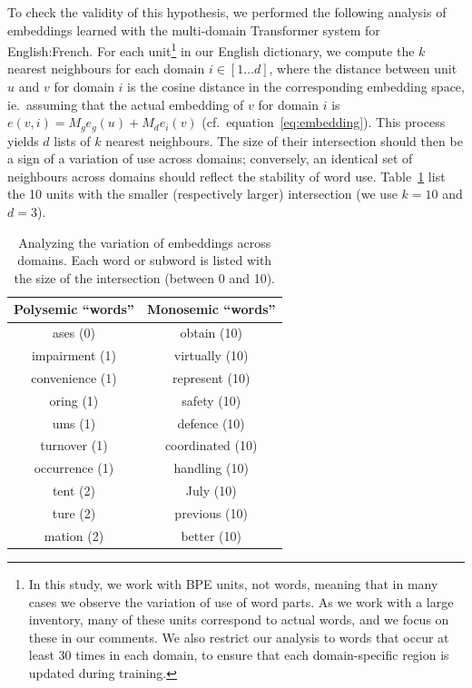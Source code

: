 \documentclass[11pt,a4paper]{article}
\begin{document}
To check the validity of this hypothesis, we performed the following analysis of embeddings learned with the multi-domain Transformer system for English:French. For each unit\footnote{In this study, we work with BPE units, not words, meaning that in many cases we observe the variation of use of word parts. As we work with a large inventory, many of these units correspond to actual words, and we focus on these in our comments. We also restrict our analysis to words that occur at least 30 times in each domain, to ensure that each domain-specific region is updated during training.} in our English dictionary, we compute the $k$ nearest neighbours for each domain $i \in [1\dots{}d]$, where the distance between unit $u$ and $v$ for domain $i$ is the cosine distance in the corresponding embedding space, ie.\ assuming that the actual embedding of $v$ for domain $i$ is $e(v,i) = M_ge_g(u) + M_de_i(v)$ (cf.\ equation~\eqref{eq:embedding}). This process yields $d$ lists of $k$ nearest neighbours. The size of their intersection should then be a sign of a variation of use across domains; conversely, an identical set of neighbours across domains should reflect the stability of word use. Table~\ref{tab:embeddings} list the 10 units with the smaller (respectively larger) intersection (we use $k=10$ and $d=3$). 

\begin{table}
  \centering
  \begin{tabularx}{1.0\linewidth}{c|c}
    Polysemic ``words'' & Monosemic ``words'' \\ \hline
     ases (0) &               obtain (10) \\       
     impairment (1) &     virtually (10) \\    
     convenience (1) &    represent (10) \\    
     oring (1) &              safety (10) \\       
     ums (1) &               defence (10) \\      
     turnover (1) &         coordinated (10) \\  
     occurrence (1) &     handling (10) \\     
     tent (2) &               July (10) \\         
     ture (2) &               previous (10) \\     
     mation (2) &           better (10) \\ \hline
  \end{tabularx}
  \caption{Analyzing the variation of embeddings across domains. Each word or subword is listed with the size of the intersection (between 0 and 10).}
  \label{tab:embeddings}
\end{table}
\end{document}
